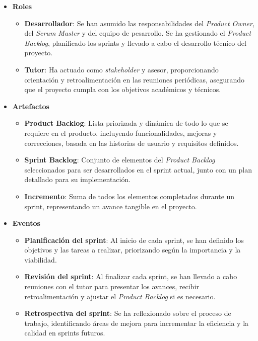 \begin{itemize}
	\item \textbf{Roles}
	\begin{itemize} 
		\item \textbf{Desarrollador}: Se han asumido las responsabilidades del \textit{Product Owner}, del \textit{Scrum Master} y del equipo de pesarrollo. Se ha gestionado el \textit{Product Backlog}, planificado los sprints y llevado a cabo el desarrollo técnico del proyecto.
		\item \textbf{Tutor}: Ha actuado como \textit{stakeholder} y asesor, proporcionando orientación y retroalimentación en las reuniones periódicas, asegurando que el proyecto cumpla con los objetivos académicos y técnicos. 
	\end{itemize}

\newpage

	\item  \textbf{Artefactos}
	\begin{itemize} 
		\item \textbf{Product Backlog}: Lista priorizada y dinámica de todo lo que se requiere en el producto, incluyendo funcionalidades, mejoras y correcciones, basada en las historias de usuario y requisitos definidos.
		\item \textbf{Sprint Backlog}: Conjunto de elementos del \textit{Product Backlog} seleccionados para ser desarrollados en el sprint actual, junto con un plan detallado para su implementación.
		\item \textbf{Incremento}: Suma de todos los elementos completados durante un sprint, representando un avance tangible en el proyecto.
	\end{itemize}
	
	\item \textbf{Eventos}
	\begin{itemize} 
		\item \textbf{Planificación del sprint}: Al inicio de cada sprint, se han definido los objetivos y las tareas a realizar, priorizando según la importancia y la viabilidad.
		\item \textbf{Revisión del sprint}: Al finalizar cada sprint, se han llevado a cabo reuniones con el tutor para presentar los avances, recibir retroalimentación y ajustar el \textit{Product Backlog} si es necesario.
		\item \textbf{Retrospectiva del sprint}: Se ha reflexionado sobre el proceso de trabajo, identificando áreas de mejora para incrementar la eficiencia y la calidad en sprints futuros.
	\end{itemize}
\end{itemize}


